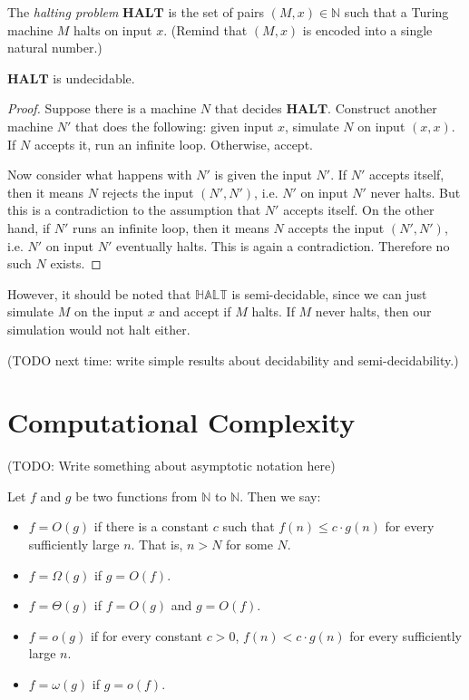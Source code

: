 	\begin{defn} \label{def_halting}
	    The \emph{halting problem} $\mathbf{HALT}$ is the set of pairs $(M,x) \in \mathbb{N}$ such that a Turing machine $M$ halts on input $x$. (Remind that $(M,x)$ is encoded into a single natural number.)
	\end{defn}
	
	\begin{thm} \label{thm_halting}
	    $\mathbf{HALT}$ is undecidable.
	\end{thm}
	
	\begin{proof}
	    Suppose there is a machine $N$ that decides $\mathbf{HALT}$. Construct another machine $N'$ that does the following: given input $x$, simulate $N$ on input $(x,x)$. If $N$ accepts it, run an infinite loop. Otherwise, accept.
	    
	    Now consider what happens with $N'$ is given the input $N'$. If $N'$ accepts itself, then it means $N$ rejects the input $(N',N')$, i.e. $N'$ on input $N'$ never halts. But this is a contradiction to the assumption that $N'$ accepts itself. On the other hand, if $N'$ runs an infinite loop, then it means $N$ accepts the input $(N',N')$, i.e. $N'$ on input $N'$ eventually halts. This is again a contradiction. Therefore no such $N$ exists.
	\end{proof}
	
	However, it should be noted that $\mathbb{HALT}$ is semi-decidable, since we can just simulate $M$ on the input $x$ and accept if $M$ halts. If $M$ never halts, then our simulation would not halt either.
	
	(TODO next time: write simple results about decidability and semi-decidability.)

    \section{Computational Complexity}
    (TODO: Write something about asymptotic notation here)
        
    \begin{defn} \label{def_bigo}
        Let $f$ and $g$ be two functions from $\mathbb{N}$ to $\mathbb{N}$. Then we say: \begin{itemize}
            \item $f=O(g)$ if there is a constant $c$ such that $f(n) \leq c \cdot g(n)$ for every sufficiently large $n$. That is, $n>N$ for some $N$.
            \item $f=\Omega(g)$ if $g=O(f)$.
            \item $f=\Theta(g)$ if $f=O(g)$ and $g=O(f)$.
            \item $f=o(g)$ if for every constant $c>0$, $f(n) < c \cdot g(n)$ for every sufficiently large $n$.
            \item $f=\omega(g)$ if $g=o(f)$.
        \end{itemize} 
    \end{defn}
        
